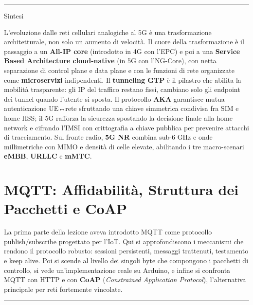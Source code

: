 \documentclass[
  italian,
  openany]{book}
\begin{document}
\begin{center}\rule{0.5\linewidth}{0.5pt}\end{center}

\begin{calloutnote}{Sintesi}

L'evoluzione dalle reti cellulari analogiche al 5G è una trasformazione
architetturale, non solo un aumento di velocità. Il cuore della
trasformazione è il passaggio a un \textbf{All-IP core} (introdotto in
4G con l'EPC) e poi a una \textbf{Service Based Architecture
cloud-native} (in 5G con l'NG-Core), con netta separazione di control
plane e data plane e con le funzioni di rete organizzate come
\textbf{microservizi} indipendenti. Il \textbf{tunneling GTP} è il
pilastro che abilita la mobilità trasparente: gli IP del traffico
restano fissi, cambiano solo gli endpoint dei tunnel quando l'utente si
sposta. Il protocollo \textbf{AKA} garantisce mutua autenticazione
UE↔rete sfruttando una chiave simmetrica condivisa fra SIM e home HSS;
il 5G rafforza la sicurezza spostando la decisione finale alla home
network e cifrando l'IMSI con crittografia a chiave pubblica per
prevenire attacchi di tracciamento. Sul fronte radio, \textbf{5G NR}
combina sub-6 GHz e onde millimetriche con MIMO e densità di celle
elevate, abilitando i tre macro-scenari \textbf{eMBB}, \textbf{URLLC} e
\textbf{mMTC}.

\end{calloutnote}

\newpage

\chapter{MQTT: Affidabilità, Struttura dei Pacchetti e
CoAP}\label{mqtt-affidabilituxe0-struttura-dei-pacchetti-e-coap}

La prima parte della lezione aveva introdotto MQTT come protocollo
publish/subscribe progettato per l'IoT. Qui si approfondiscono i
meccanismi che rendono il protocollo robusto: sessioni persistenti,
messaggi trattenuti, testamento e keep alive. Poi si scende al livello
dei singoli byte che compongono i pacchetti di controllo, si vede
un'implementazione reale su Arduino, e infine si confronta MQTT con HTTP
e con \textbf{CoAP} (\emph{Constrained Application Protocol}),
l'alternativa principale per reti fortemente vincolate.

\begin{center}\rule{0.5\linewidth}{0.5pt}\end{center}
\end{document}

